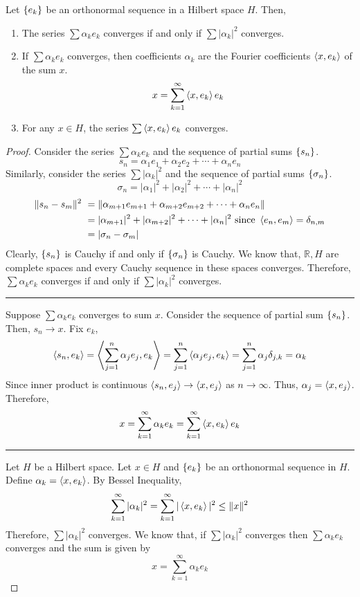 \begin{theorem}[convergence]
Let $\left\{e_k\right\}$ be an orthonormal sequence in a Hilbert space $H$.
Then,
\begin{enumerate}
	\item The series $\sum \alpha_k e_k$ converges
	if and only if $\sum |\alpha_k|^2$ converges.
\item If $\sum \alpha_k e_k$ converges, then coefficients $\alpha_k$ are the Fourier coefficients $\left\langle x,e_k \right\rangle$ of the sum $x$.
	\[ x = \sum_{k=1}^\infty \left\langle x,e_k \right\rangle e_k \]
\item For any $x \in H$, the series $\sum \left\langle x,e_k \right\rangle e_k$ converges.
\end{enumerate}
\end{theorem}
\begin{proof}
	Consider the series $\sum \alpha_k e_k$ and the sequence of partial sums $\left\{s_n\right\}$.
	\[ s_n = \alpha_1 e_1 + \alpha_2 e_2 + \dotsb + \alpha_n e_n \]
	Similarly, consider the series $\sum |\alpha_k|^2$ and the sequence of partial sums $\left\{\sigma_n\right\}$.
	\[ \sigma_n = |\alpha_1|^2 + |\alpha_2|^2 + \dotsb + |\alpha_n|^2 \]
	\begin{align*}
		\|s_n - s_m\|^2 \
		& = \| \alpha_{m+1}e_{m+1} + \alpha_{m+2} e_{m+2} + \dotsb + \alpha_n e_n \| \\
		& = |\alpha_{m+1}|^2 + |\alpha_{m+2}|^2 + \dotsb + |\alpha_n|^2 \text{ since } \left\langle e_n,e_m \right\rangle = \delta_{n,m} \\
		& = |\sigma_n-\sigma_m|
	\end{align*}
	Clearly, $\left\{s_n\right\}$ is Cauchy if and only if $\left\{\sigma_n\right\}$ is Cauchy.
	We know that, $\mathbb{R},H$ are complete spaces and every Cauchy sequence in these spaces converges.
	Therefore, $\sum \alpha_k e_k$ converges if and only if $\sum |\alpha_k|^2$ converges.\\

	\hrule \vspace{1em}

	Suppose $\sum \alpha_k e_k$ converges to sum $x$.
	Consider the sequence of partial sum $\left\{s_n\right\}$.
	Then, $s_n \to x$.
	Fix $e_k$,
	\[ \left\langle s_n,e_k \right\rangle = \left\langle \sum_{j=1}^n \alpha_j e_j,e_k \right\rangle = \sum_{j=1}^n \left\langle \alpha_j e_j,e_k \right\rangle = \sum_{j=1}^n \alpha_j \delta_{j,k} = \alpha_k \]
	Since inner product is continuous $\left\langle s_n,e_j \right\rangle \to \left\langle x,e_j \right\rangle$ as $n \to \infty$.
	Thus, $\alpha_j = \left\langle x,e_j \right\rangle$.
	Therefore, 
	\[ x = \sum_{k=1}^\infty \alpha_k e_k = \sum_{k=1}^\infty \left\langle x,e_k \right\rangle e_k \]

	\hrule \vspace{1em}

	Let $H$ be a Hilbert space.
	Let $x \in H$ and $\left\{e_k\right\}$ be an orthonormal sequence in $H$.
	Define $\alpha_k = \left\langle x,e_k \right\rangle$.
	By Bessel Inequality,
	\[ \sum_{k=1}^\infty |\alpha_k|^2 = \sum_{k=1}^\infty |\left\langle x,e_k \right\rangle|^2 \le \|x\|^2 \]
	Therefore, $\sum |\alpha_k|^2$ converges.
	We know that, if $\sum |\alpha_k|^2$ converges then $\sum \alpha_k e_k$ converges and the sum is given by
	\[ x = \sum_{k=1}^\infty \alpha_k e_k \]
\end{proof}

